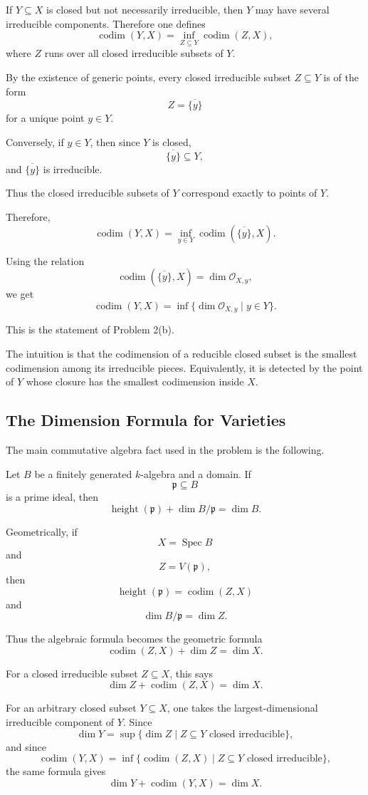 \documentclass[12pt,a4paper]{article}
\DeclareMathOperator{\Spec}{Spec}
\newcommand{\codim}{\operatorname{codim}}
\newcommand{\height}{\operatorname{height}}
\providecommand{\Spec}{\operatorname{Spec}}
\theoremstyle{notespace}
\begin{document}
If \(Y\subseteq X\) is closed but not necessarily irreducible, then \(Y\) may have several irreducible components. Therefore one defines
\[
\codim(Y,X)
=
\inf_{Z\subseteq Y}\codim(Z,X),
\]
where \(Z\) runs over all closed irreducible subsets of \(Y\).

By the existence of generic points, every closed irreducible subset \(Z\subseteq Y\) is of the form
\[
Z=\overline{\{y\}}
\]
for a unique point \(y\in Y\).

Conversely, if \(y\in Y\), then since \(Y\) is closed,
\[
\overline{\{y\}}\subseteq Y,
\]
and \(\overline{\{y\}}\) is irreducible.

Thus the closed irreducible subsets of \(Y\) correspond exactly to points of \(Y\).

Therefore,
\[
\codim(Y,X)
=
\inf_{y\in Y}\codim(\overline{\{y\}},X).
\]

Using the relation
\[
\codim(\overline{\{y\}},X)
=
\dim \mathcal O_{X,y},
\]
we get
\[
\boxed{
	\codim(Y,X)
	=
	\inf\{\dim \mathcal O_{X,y}\mid y\in Y\}.
}
\]

This is the statement of Problem 2(b).

The intuition is that the codimension of a reducible closed subset is the smallest codimension among its irreducible pieces. Equivalently, it is detected by the point of \(Y\) whose closure has the smallest codimension inside \(X\).

\subsection{The Dimension Formula for Varieties}

The main commutative algebra fact used in the problem is the following.

Let \(B\) be a finitely generated \(k\)-algebra and a domain. If
\[
\mathfrak p\subseteq B
\]
is a prime ideal, then
\[
\boxed{
	\height(\mathfrak p)+\dim B/\mathfrak p=\dim B.
}
\]

Geometrically, if
\[
X=\Spec B
\]
and
\[
Z=V(\mathfrak p),
\]
then
\[
\height(\mathfrak p)=\codim(Z,X)
\]
and
\[
\dim B/\mathfrak p=\dim Z.
\]

Thus the algebraic formula becomes the geometric formula
\[
\boxed{
	\codim(Z,X)+\dim Z=\dim X.
}
\]

For a closed irreducible subset \(Z\subseteq X\), this says
\[
\dim Z+\codim(Z,X)=\dim X.
\]

For an arbitrary closed subset \(Y\subseteq X\), one takes the largest-dimensional irreducible component of \(Y\). Since
\[
\dim Y
=
\sup\{\dim Z\mid Z\subseteq Y \text{ closed irreducible}\},
\]
and since
\[
\codim(Y,X)
=
\inf\{\codim(Z,X)\mid Z\subseteq Y \text{ closed irreducible}\},
\]
the same formula gives
\[
\boxed{
	\dim Y+\codim(Y,X)=\dim X.
}
\]
\end{document}
